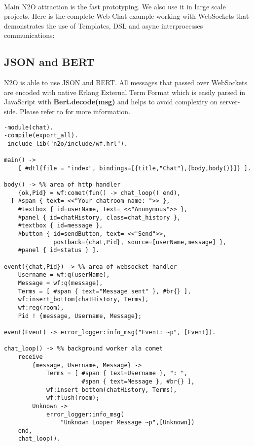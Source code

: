 \paragraph{}
Main N2O attraction is the fast prototyping. We also use it in large
scale projects. Here is the complete Web Chat example working with
WebSockets that demonstrates the use of Templates, DSL and async
interprocesses communications:

\subsection*{JSON and BERT}
N2O is able to use JSON and BERT. All messages that passed over
WebSockets are encoded with native Erlang External Term Format
which is easily parsed in JavaScript with {\bf Bert.decode(msg)}
and helps to avoid complexity on server-side. Please refer
to  for more information.

\newpage
\begin{lstlisting}[caption=chat.erl]
-module(chat).
-compile(export_all).
-include_lib("n2o/include/wf.hrl").

main() -> 
    [ #dtl{file = "index", bindings=[{title,"Chat"},{body,body()}]} ].

body() -> %% area of http handler
    {ok,Pid} = wf:comet(fun() -> chat_loop() end),
  [ #span { text= <<"Your chatroom name: ">> }, 
    #textbox { id=userName, text= <<"Anonymous">> },
    #panel { id=chatHistory, class=chat_history },
    #textbox { id=message },
    #button { id=sendButton, text= <<"Send">>, 
              postback={chat,Pid}, source=[userName,message] },
    #panel { id=status } ].

event({chat,Pid}) -> %% area of websocket handler
    Username = wf:q(userName),
    Message = wf:q(message),
    Terms = [ #span { text="Message sent" }, #br{} ],
    wf:insert_bottom(chatHistory, Terms),
    wf:reg(room),
    Pid ! {message, Username, Message};

event(Event) -> error_logger:info_msg("Event: ~p", [Event]).

chat_loop() -> %% background worker ala comet
    receive 
        {message, Username, Message} ->
            Terms = [ #span { text=Username }, ": ",
                      #span { text=Message }, #br{} ],
            wf:insert_bottom(chatHistory, Terms),
            wf:flush(room);
        Unknown -> 
            error_logger:info_msg(
                "Unknown Looper Message ~p",[Unknown])
    end,
    chat_loop().
\end{lstlisting}

